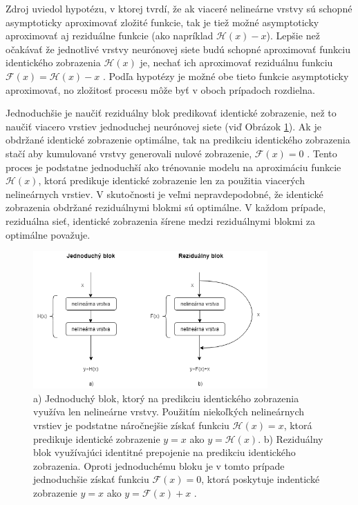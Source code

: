 Zdroj \cite{Wu2017} uviedol hypotézu, v ktorej tvrdí, že ak viaceré nelineárne vrstvy sú schopné asymptoticky aproximovať zložité funkcie, tak je tiež možné asymptoticky aproximovať aj reziduálne funkcie (ako napríklad $\mathcal{H}(x) - x$). Lepšie než očakávať že jednotlivé vrstvy neurónovej siete budú schopné aproximovať funkciu identického zobrazenia $\mathcal{H}(x)$ je, nechať ich aproximovať reziduálnu funkciu $\mathcal{F}(x) = \mathcal{H}(x) - x$ \cite{Wu2017}. Podľa hypotézy je možné obe tieto funkcie asymptoticky aproximovať, no zložitosť procesu môže byť v oboch prípadoch rozdielna.

Jednoduchšie je naučiť reziduálny blok predikovať identické zobrazenie, než to naučiť viacero vrstiev jednoduchej neurónovej siete (viď Obrázok \ref{fig:plainNetVsResNet}). Ak je obdržané identické zobrazenie optimálne, tak na predikciu identického zobrazenia stačí aby kumulované vrstvy generovali nulové zobrazenie, $\mathcal{F}(x)=0$ \cite{Wu2017}. Tento proces je podstatne jednoduchší ako trénovanie modelu na aproximáciu funkcie $\mathcal{H}(x)$, ktorá predikuje identické zobrazenie len za použitia viacerých nelineárnych vrstiev. V skutočnosti je veľmi nepravdepodobné, že identické zobrazenia obdržané reziduálnymi blokmi sú optimálne. V každom prípade, reziduálna sieť, identické zobrazenia šírene medzi reziduálnymi blokmi za optimálne považuje.

\begin{figure}

\centerline{\includegraphics[width=0.8\textwidth]{images/plainNetVsResNet}}
\caption[Porovnanie jednoduchého a reziduálneho bloku]{a) Jednoduchý blok, ktorý na predikciu identického zobrazenia využíva len nelineárne vrstvy. Použitím niekoľkých nelineárnych vrstiev je podstatne náročnejšie získať funkciu $\mathcal{H}(x)=x$, ktorá predikuje identické zobrazenie $y=x$ ako $y=\mathcal{H}(x)$. b) Reziduálny blok využívajúci identitné prepojenie na predikciu identického zobrazenia. Oproti jednoduchému bloku je v tomto prípade jednoduchšie získať funkciu $\mathcal{F}(x)=0$, ktorá poskytuje indentické zobrazenie $y=x$ ako $y=\mathcal{F}(x)+x$ \cite{Wu2017}.}
\label{fig:plainNetVsResNet}
\end{figure}


